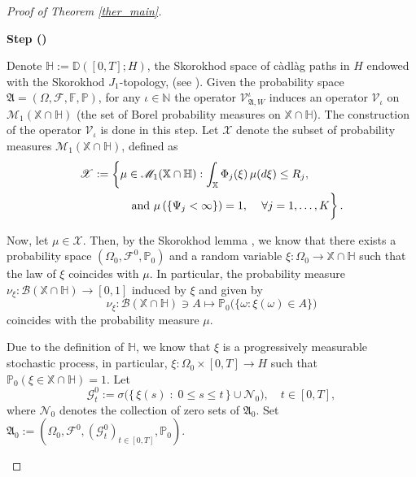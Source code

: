 \documentclass[english,a4paper,11pt]{amsart}
\theoremstyle{plain}
\theoremstyle{definition}
\theoremstyle{remark}
\numberwithin{equation}{section}
\newcounter{lil1}
\newenvironment{step}
{\begin{list} { \bf Step (\Roman{lil1})}
		{ \usecounter{lil1}
			\setlength{\leftmargin}{0.0cm}
			\setlength{\topsep}{0.2cm}
			\setlength{\itemsep}{0.0cm}
			\setlength{\parsep}{0.1cm}
			\setlength{\itemindent}{0.8cm}
			\setlength{\parskip}{0.0cm}}}
	{\end{list}}
\newcounter{lil33}
\newcounter{lil1q}
\newcommand{\lqq}{\lefteqn}
\newcommand{\CG}{{{ \mathcal G }}}
\newcommand{\CB}{{{ \mathcal B }}}
\newcommand{\CF}{{{ \mathcal F }}}
\newcommand{\CN}{{{ \mathcal N }}}
\newcommand{\NN}{\mathbb{N}}
\newcommand{\PP}{{\mathbb{P}}}
\begin{document}
\begin{proof}[Proof of Theorem \ref{ther_main}]
\begin{step}
\item\label{ST2}
Denote $\mathbb{H}:=\mathbb{D}([0,T];H)$, the Skorokhod space of c\`adl\`ag paths in $H$ endowed with the Skorokhod $J_1$-topology, (see \cite[Appendix A2]{Kallenberg}). Given the probability space $\mathfrak{A}=\left(\Omega,\CF,\mathbb{F},\PP\right)$,
for any $\iota \in\NN$ the operator $\mathcal{V}^\iota _{\mathfrak{A},W}$
induces  an operator $\mathscr{V}_\iota$ on $\mathscr{M}_1(\mathbb{X}\cap\mathbb{H})$ (the set of Borel probability measures on $\mathbb{X}\cap\mathbb{H}$).
The construction of the operator $\mathscr{V}_\iota$ is done in this step.
Let $\mathscr{X}$ denote the subset of probability measures $\mathscr{M}_1(\mathbb{X}\cap\mathbb{H})$, defined as
\begin{align*}
\lqq{ \mathscr{X}:=\left\{ \mu\in \mathscr{M}_1(\mathbb{X}\cap\mathbb{H}):\int_{\mathbb{X}}\Phi_j(\xi)\,\mu(d\xi)\le R_j,\right.
}
\\
&& \left. \phantom{\int_{\mathbb{X}}}
\qquad
\mbox{ and } \mu\left(\{\Psi_j<\infty\}\right)=1,\, \quad \forall j=1,\ldots,K\right\}.
\end{align*}

Now, let $\mu\in\mathscr{X}$. Then, by the Skorokhod lemma \cite[Theorem 4.30]{Kallenberg}, we know that there exists a
probability space  $(\Omega_0,\CF^0,\PP_0)$ and a random variable
$\xi:\Omega_0\to \mathbb{X}\cap\mathbb{H}$ such that the law of $\xi$ coincides with $\mu$.
In particular,
the probability measure $\nu_\xi:\CB(\mathbb{X}\cap\mathbb{H})\to[0,1]$ induced by $\xi$ and given by
$$
\nu_\xi:\CB(\mathbb{X}\cap\mathbb{H})\ni A\mapsto \PP_0\big(\big\{ \omega:\xi(\omega)\in A\big\}\big)
$$
coincides with the probability measure $\mu$.

Due to the definition of $\mathbb{H}$, we know that $\xi$ is a progressively measurable stochastic process, in particular, $\xi:\Omega_0\times [0,T]\to H$ such that $\PP_0(\xi\in\mathbb{X}\cap\mathbb{H})=1$.
Let
$$
\CG^0_t:=\sigma \Big( \big\{\,\xi (s)\;\colon\; 0\le s\le t \, \big\}\cup \CN_0\Big),\quad t\in [0,T],
$$
where $\CN_0$ denotes the collection of zero sets of ${\mathfrak{A}}_0$.
Set $\mathfrak{A}_0:=(\Omega_0,\CF^0,(\CG_t^0)_{t\in[0,T]},\PP_0)$.


\end{step}
\end{proof}
\end{document}
